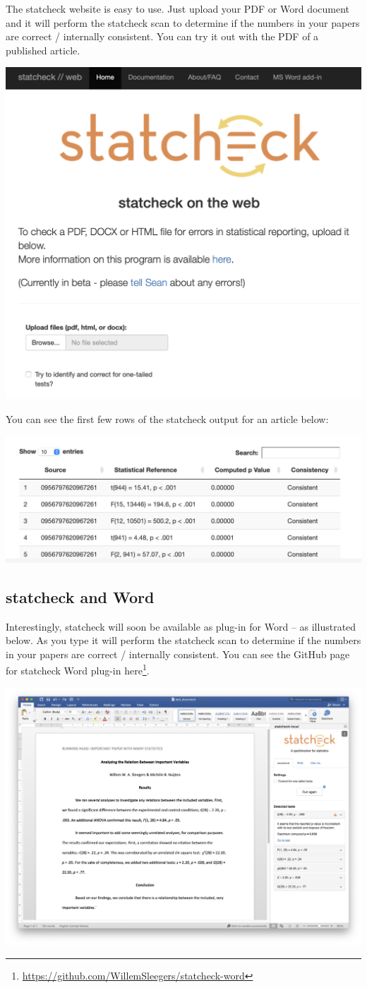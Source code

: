 \documentclass[
]{krantz}
\renewcommand{\href}[2]{#2\footnote{\url{#1}}}
\begin{document}
The statcheck website is easy to use. Just upload your PDF or Word document and it will perform the statcheck scan to determine if the numbers in your papers are correct / internally consistent. You can try it out with the PDF of a published article.

\includegraphics[width=0.6\linewidth]{ch_tools/images/statcheck_website}

You can see the first few rows of the statcheck output for an article below:

\includegraphics[width=0.6\linewidth]{ch_tools/images/statcheck_output}

\hypertarget{statcheck-and-word}{%
\subsection{statcheck and Word}\label{statcheck-and-word}}

Interestingly, statcheck will soon be available as plug-in for Word -- as illustrated below. As you type it will perform the statcheck scan to determine if the numbers in your papers are correct / internally consistent. You can see the GitHub page for statcheck Word plug-in \href{https://github.com/WillemSleegers/statcheck-word}{here}.

\includegraphics[width=0.8\linewidth]{ch_tools/images/statcheck_word}
\end{document}
